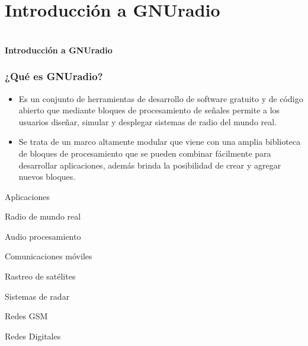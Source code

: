 
\section{Introducci\'on a GNUradio}

\begin{frame}{}


\bfseries{\textrm{\Large \\Introducci\'on a GNUradio}}
\raggedright
\end{frame}



\begin{frame}
  
  
  \frametitle{¿Qu\'e es GNUradio?}

  \begin{itemize}
  \item {
    Es un conjunto de herramientas de desarrollo de software gratuito y de c\'odigo abierto que mediante bloques de procesamiento de se\~nales permite a los usuarios dise\~nar, simular y desplegar sistemas de radio del mundo real.\\
  }
  \item {
    Se trata de un marco altamente modular que viene con una amplia biblioteca de bloques de procesamiento que se pueden combinar f\'acilmente para desarrollar aplicaciones, adem\'as brinda la posibilidad de crear y agregar nuevos bloques.
  }
  \end{itemize}
\end{frame}



\begin{frame}{Aplicaciones}
  \begin{itemize}
  \item {
    Radio de mundo real}
  \item{
    Audio procesamiento} 
  \item{
    Comunicaciones m\'oviles}
  \item{
    Rastreo de sat\'elites}
  \item{
    Sistemas de radar}
  \item{
    Redes GSM
  \item{
    Redes Digitales}
 }
    \end{itemize}
\end{frame}



